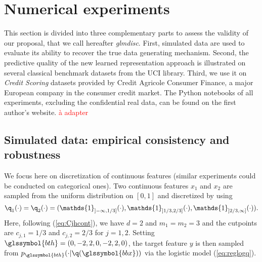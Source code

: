  
 
 \section{Numerical experiments} \label{sec:experiments}

This section is divided into three complementary parts to assess the validity of our proposal, that we call hereafter \textit{glmdisc}. First, simulated data are used to evaluate its ability to recover the true data generating mechanism. Second, the predictive quality of the new learned representation approach is illustrated on several classical benchmark datasets from the UCI library. Third, we use it on \textit{Credit Scoring} datasets provided by Credit Agricole Consumer Finance, a major European company in the consumer credit market. The Python notebooks of all experiments, excluding the confidential real data, can be found on the first author's website. \textcolor{red}{à adapter}


\subsection{Simulated data: empirical consistency and robustness}

We focus here on discretization of continuous features (similar experiments could be conducted on categorical ones). Two continuous features $x_1$ and $x_2$ are sampled from the uniform distribution on $[0,1]$ and discretized by using
\[\q_1(\cdot)=\q_2(\cdot) = (\mathds{1}_{]-\infty,1/3]}(\cdot),\mathds{1}_{]1/3,2/3]}(\cdot),\mathds{1}_{]2/3,\infty]}(\cdot)).\]
Here, following (\ref{eq:Cjhcont}), we have $d=2$ and $m_1=m_2=3$ and the cutpoints are $c_{j,1}=1/3$ and $c_{j,2}=2/3$ for $j=1,2$. Setting $\glssymbol{bth}=(0,-2,2,0,-2,2,0)$, the target feature $y$ is then sampled from $p_{\glssymbol{bth}}(\cdot | \q(\glssymbol{bbx}))$ via the logistic model (\ref{eq:reglogq}).

